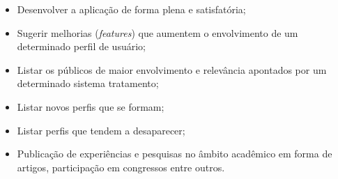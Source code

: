 \documentclass[12pt]{article}
\begin{document}
\begin{itemize}[label={\checkmark}]
    \item Desenvolver a aplicação de forma plena e satisfatória;
    \item Sugerir melhorias (\textit{features}) que aumentem o envolvimento de um determinado perfil de usuário;
    \item Listar os públicos de maior envolvimento e relevância apontados por um determinado sistema tratamento;
    \item Listar novos perfis que se formam;
    \item Listar perfis que tendem a desaparecer;
    \item Publicação de experiências e pesquisas no âmbito acadêmico em forma de artigos, participação em congressos entre outros.
\end{itemize}



\end{document}
